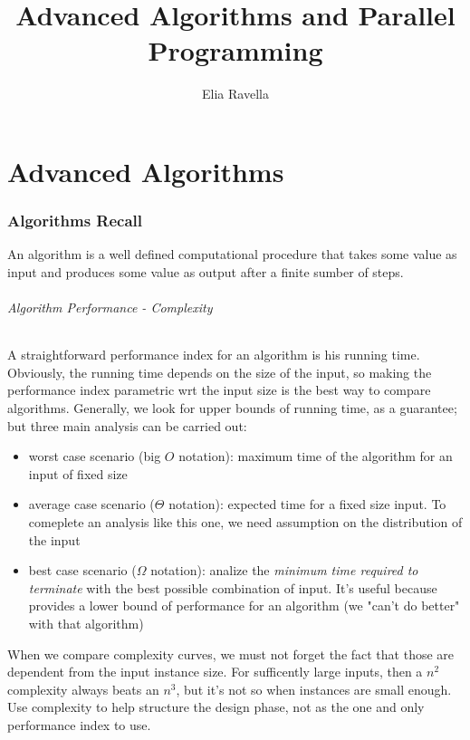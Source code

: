 \documentclass{article}
\title{Advanced Algorithms and Parallel Programming}
\author{Elia Ravella}
\begin{document}
	\begin{titlepage}
		\maketitle
	\end{titlepage}
	
	\tableofcontents
	\clearpage

	\part{Advanced Algorithms}
	\section{Algorithms Recall}
		An algorithm is a well defined computational procedure that takes some value as input and produces some value as output after a finite sumber of steps.
		
		\paragraph{Algorithm Performance - Complexity}
			A straightforward performance index for an algorithm is his running time. Obviously, the running time depends on the size of the input, so making the performance index parametric wrt the input size is the best way to compare algorithms. Generally, we look for upper bounds of running time, as a guarantee; but three main analysis can be carried out:
			\begin{itemize}
				\item worst case scenario (big $O$ notation): maximum time of the algorithm for an input of fixed size
				\item average case scenario ($\Theta$ notation): expected time for a fixed size input. To comeplete an analysis like this one, we need assumption on the distribution of the input
				\item best case scenario ($\Omega$ notation): analize the \textit{minimum time required to terminate} with the best possible combination of input. It's useful because provides a lower bound of performance for an algorithm (we "can't do better" with that algorithm)
			\end{itemize}
			When we compare complexity curves, we must not forget the fact that those are dependent from the input instance size. For sufficently large inputs, then a $n^2$ complexity always beats an $n^3$, but it's not so when instances are small enough. Use complexity to help structure the design phase, not as the one and only performance index to use.
\end{document}
